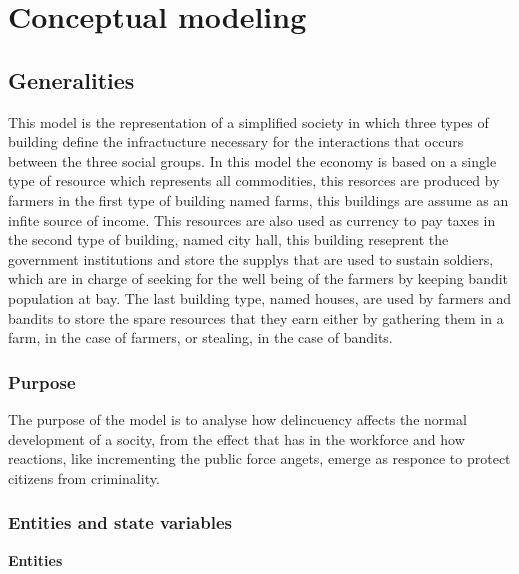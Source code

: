 \documentclass{wscpaperproc}
\begin{document}
\section{Conceptual modeling}

\subsection{Generalities}

This model is the representation of a simplified society in which three types
of building define the infractucture necessary for the interactions that occurs
between the three social groups. In this model the
economy is based on a single type of resource which represents all commodities,
this resorces are produced by farmers in the first type of building named
farms, this buildings are assume as an infite source of income. This
resources are also used as currency to pay taxes in the second type of
building, named city hall, this building reseprent the government
institutions and store the supplys that are used to sustain soldiers,
which are in charge of seeking for the well being of the farmers by
keeping bandit population at bay. The last building type, named houses,
are used by farmers and bandits to store the spare resources that they
earn either by gathering them in a farm, in the case of farmers, or
stealing, in the case of bandits.

\subsubsection{Purpose}

The purpose of the model is to analyse how delincuency affects the normal
development of a socity, from the effect that has in the workforce and how
reactions, like incrementing the public force angets, emerge as responce to
protect citizens from criminality.

\subsubsection{Entities and state variables}
\noindent \textbf{Entities}
\end{document}

